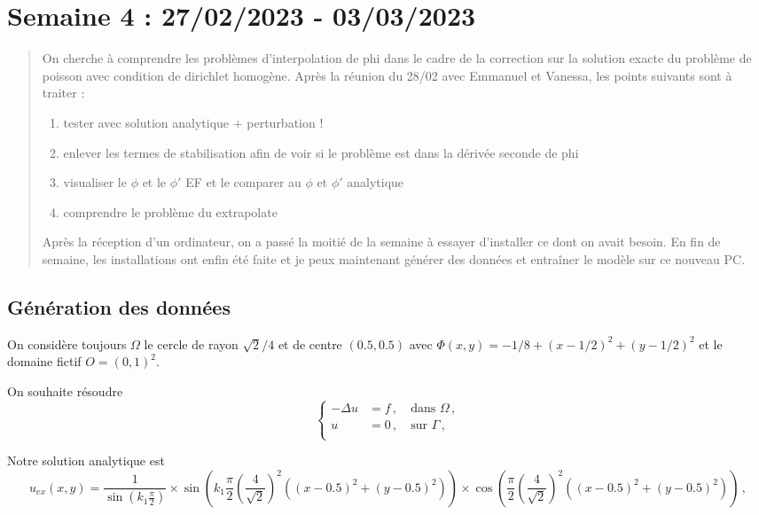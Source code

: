 \section{Semaine 4 : 27/02/2023 - 03/03/2023}
\graphicspath{{semaines/semaine_4/images/}}

\begin{abstract}
	On cherche à comprendre les problèmes d'interpolation de phi dans le cadre de la correction sur la solution exacte du problème de poisson avec condition de dirichlet homogène. Après la réunion du 28/02 avec Emmanuel et Vanessa, les points suivants sont à traiter :
	\begin{enumerate}[label=\textbullet]
		\item tester avec solution analytique + perturbation !
		\item enlever les termes de stabilisation afin de voir si le problème est dans la dérivée seconde de phi
		\item visualiser le $\phi$ et le $\phi'$ EF et le comparer au $\phi$ et $\phi'$ analytique
		\item comprendre le problème du extrapolate
	\end{enumerate}
	Après la réception d'un ordinateur, on a passé la moitié de la semaine à essayer d'installer ce dont on avait besoin. En fin de semaine, les installations ont enfin été faite et je peux maintenant générer des données et entraîner le modèle sur ce nouveau PC.
\end{abstract}

\subsection{Génération des données}

On considère toujours $\Omega$ le cercle de rayon $\sqrt{2}/4$ et de centre $(0.5,0.5)$ avec $\Phi(x,y)=-1/8+(x-1/2)^2+(y-1/2)^2$ et le domaine fictif $O=(0,1)^2$.

On souhaite résoudre 
\begin{equation*}
	\begin{cases}
		-\Delta u &= f\,, \quad \text{dans $\Omega$}\,, \\
		u &= 0\,, \quad \text{sur $\Gamma$}\,, \\
	\end{cases}
\end{equation*}

Notre solution analytique est
$$u_{ex}(x,y) = \frac{1}{\sin\left(k_1\frac{\pi}{2}\right)}\times\sin\left(k_1\frac{\pi}{2}\left(\frac{4}{\sqrt{2}}\right)^2\left((x-0.5)^2+(y-0.5)^2\right)\right)\times\cos\left(\frac{\pi}{2}\left(\frac{4}{\sqrt{2}}\right)^2\left((x-0.5)^2+(y-0.5)^2\right)\right)\,, $$ 

